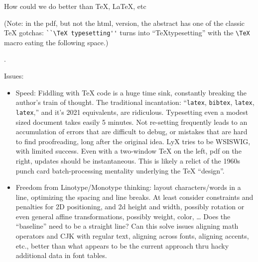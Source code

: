 \documentclass[11pt]{PalisadesLakesBook}
\begin{document}
\begin{plSection}{How could we do better than \TeX, \LaTeX, etc}



(Note: in the pdf, but not the html, version, 
the abstract has one of the classic {\TeX} gotchas:
\verb|``\TeX typesetting''| turns into
``\TeX typesetting'' with the \verb|\TeX| macro eating the 
following space.)

.

Issues:
\begin{itemize}
  
  \item Speed: Fiddling with {\TeX} code is a huge time sink, 
  constantly breaking 
  the author's train of thought.
  The traditional incantation: 
  ``\texttt{latex}, \texttt{bibtex}, \texttt{latex}, \texttt{latex},''
  and it's 2021 equivalents, are ridiculous.
  Typesetting even a modest sized document takes easily 5 minutes.
  Not re-setting frequently leads to an accumulation of errors
  that are difficult to debug, or mistakes that are hard to find
  proofreading, long after the original idea.
  LyX tries to be WSISWIG, with limited success.
  Even with a two-window {\TeX} on the left, pdf on the right,
  updates should be instantaneous.
  This is likely a relict of the 1960s punch card batch-processing
  mentality underlying the {\TeX} ``design''.
  
  \item Freedom from Linotype/Monotype thinking: 
  layout characters/words in a line, optimizing the spacing
  and line breaks.
  At least consider constraints and penalties for 2D positioning,
  and 2d height and width, possibly rotation
  or even general affine transformations,
  possibly weight, color, \ldots
  Does the ``baseline'' need to be a straight line?
  Can this solve issues aligning math operators and CJK 
  with regular text, aligning across fonts, aligning accents, 
  etc., better than what appears to be the current approach thru
  hacky additional data in font tables.
  
\end{itemize}

\end{plSection}%

\BeginAppendices

\end{document}
